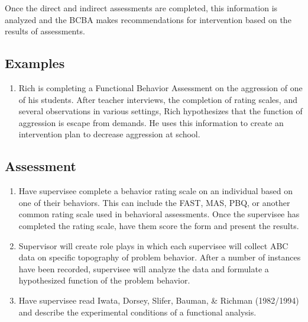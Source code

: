 Once the direct and indirect assessments are completed, this information is analyzed and the BCBA makes recommendations for intervention based on the results of assessments. 
%
\subsection{Examples}
\begin{enumerate}
\item Rich is completing a Functional Behavior Assessment on the aggression of one of his students. After teacher interviews, the completion of rating scales, and several observations in various settings, Rich hypothesizes that the function of aggression is escape from demands. He uses this information to create an intervention plan to decrease aggression at school. 
%
\end{enumerate}
%
\subsection{Assessment}
\begin{enumerate}
\item Have supervisee complete a behavior rating scale on an individual based on one of their behaviors. This can include the FAST, MAS, PBQ, or another common rating scale used in behavioral assessments. Once the supervisee has completed the rating scale, have them score the form and present the results. 
\item Supervisor will create role plays in which each supervisee will collect ABC data on specific topography of problem behavior. After a number of instances have been recorded, supervisee will analyze the data and formulate a hypothesized function of the problem behavior.
\item Have supervisee read Iwata, Dorsey, Slifer, Bauman, \& Richman (1982/1994) and describe the experimental conditions of a functional analysis.
%
\end{enumerate}
%
